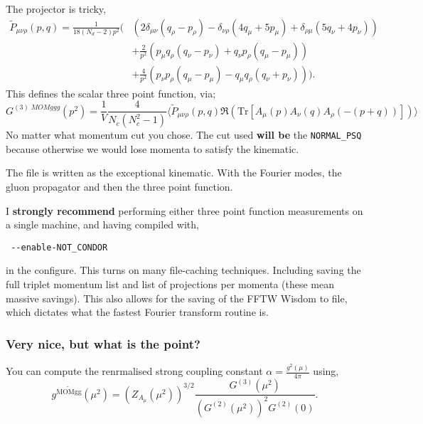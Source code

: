 \documentclass[12pt]{article}
\begin{document}
The projector is tricky,
\begin{equation}\label{chap2:eq:nonexprojectors}
\begin{aligned}
\tilde{P}_{\mu\nu\rho}(p,q) = \frac{1}{18(N_d-2)p^2}\bigg(
& \left(2\delta_{\mu\nu}(q_\rho - p_\rho) - \delta_{\nu\rho}(4q_\mu + 5p_\mu) + \delta_{\rho\mu}(5q_\nu +
4p_\nu)\right)   \\
& +\frac{2}{p^2}\left( p_\mu q_\rho (q_\nu - p_\nu)  + q_\nu p_\rho (q_\mu - p_\mu)  \right)   \\
& +\frac{4}{p^2}\left( p_\nu p_\rho(q_\mu - p_\mu) - q_\mu q_\rho (q_\nu + p_\nu) \right)
\bigg).
\end{aligned}\end{equation}
This defines the scalar three point function, via;
\begin{equation}
G^{(3) \;MOMggg}(p^2) = \frac{1}{V} \frac{4}{N_c(N_c^2-1)}
\langle \tilde{P}_{\mu\nu\rho}(p,q)\Re\left(\text{Tr}\left[A_\mu(p)A_\nu(q)A_\rho(-(p+q))\right]\right)\rangle
\end{equation}
No matter what momentum cut you chose. The cut used \textbf{will be} the \verb|NORMAL_PSQ| because otherwise we would lose momenta to satisfy the kinematic.

The file is written as the exceptional kinematic. With the Fourier modes, the gluon propagator and then the three point function.

I \textbf{strongly recommend} performing either three point function measurements on a single machine, and having compiled with,
\begin{verbatim}
 --enable-NOT_CONDOR
\end{verbatim}
in the configure. This turns on many file-caching techniques. Including saving the full triplet momentum list and list of projections per momenta (these mean massive savings). This also allows for the saving of the FFTW Wisdom to file, which dictates what the fastest Fourier transform routine is.

\subsubsection{Very nice, but what is the point?}

You can compute the renrmalised strong coupling constant $\alpha = \frac{g^2(\mu)}{4\pi}$ using,
\begin{equation}
g^{\widetilde{\text{MOMgg}}}(\mu^2) = \left(Z_{A_\mu}(\mu^2)\right)^{3/2} \frac{G^{(3)}(\mu^2)}{\left(G^{(2)}(\mu^2)\right)^2 G^{(2)}(0)}. 
\end{equation}
\end{document}
